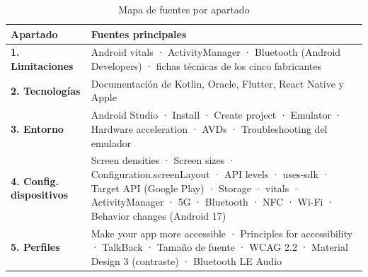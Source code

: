 \documentclass[11pt,a4paper]{article}
\begin{document}
	{\small
		\begin{table}[htbp]
			\centering
			\begin{tabularx}{\textwidth}{@{}>{\RaggedRight\arraybackslash}p{3.5cm} >{\RaggedRight\arraybackslash}X@{}}
				\toprule
				\rowcolor{primary}
				\textcolor{paper}{\sffamily\bfseries Apartado} & \textcolor{paper}{\sffamily\bfseries Fuentes principales} \\
				\midrule
				\textbf{1. Limitaciones} & Android vitals · ActivityManager · Bluetooth (Android Developers) · fichas técnicas de los cinco fabricantes \\
				\rowcolor{soft}
				\textbf{2. Tecnologías} & Documentación de Kotlin, Oracle, Flutter, React Native y Apple \\
				\textbf{3. Entorno} & Android Studio · Install · Create project · Emulator · Hardware acceleration · AVDs · Troubleshooting del emulador \\
				\rowcolor{soft}
				\textbf{4. Config. dispositivos} & Screen densities · Screen sizes · Configuration.screenLayout · API levels · uses-sdk · Target API (Google Play) · Storage · vitals · ActivityManager · 5G · Bluetooth · NFC · Wi-Fi · Behavior changes (Android 17) \\
				\textbf{5. Perfiles} & Make your app more accessible · Principles for accessibility · TalkBack · Tamaño de fuente · WCAG 2.2 · Material Design 3 (contraste) · Bluetooth LE Audio \\
				\bottomrule
			\end{tabularx}
			\caption{Mapa de fuentes por apartado}
		\end{table}
	}
	
\end{document}
